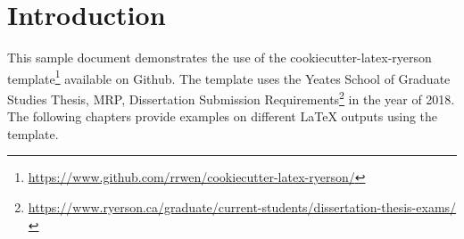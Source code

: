 

\chapter*{Introduction} \label{introduction}

This sample document demonstrates the use of the cookiecutter-latex-ryerson template\footnote{\url{https://www.github.com/rrwen/cookiecutter-latex-ryerson/}} available on Github. The template uses the Yeates School of Graduate Studies Thesis, MRP, Dissertation Submission Requirements\footnote{\url{https://www.ryerson.ca/graduate/current-students/dissertation-thesis-exams/}} in the year of 2018. The following chapters provide examples on different LaTeX outputs using the template.
